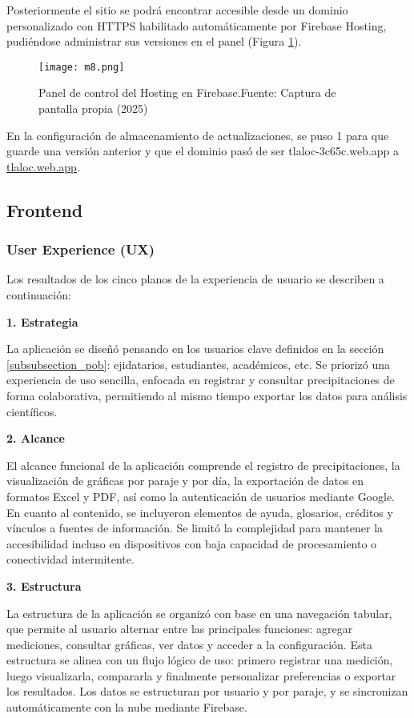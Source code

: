 Posteriormente el sitio se podrá encontrar accesible desde un dominio personalizado con HTTPS habilitado automáticamente por Firebase Hosting, pudiéndose administrar sus versiones en el panel (Figura \ref{m8}).
\begin{figure}[ht]
\centering
  \texttt{[image: m8.png]}
  \caption{Panel de control del Hosting en Firebase.Fuente: Captura de pantalla propia (2025)}
  \label{m8}
\end{figure}
En la configuración de almacenamiento de actualizaciones, se puso 1 para que guarde una versión anterior y que el dominio pasó de ser tlaloc-3c65c.web.app a \url{tlaloc.web.app}.

\newpage
\subsection{Frontend}
\subsubsection{User Experience (UX)}
Los resultados de los cinco planos de la experiencia de usuario se describen a continuación:


\textbf{1. Estrategia}

La aplicación se diseñó pensando en los usuarios clave definidos en la sección \ref{subsubsection_pob}: ejidatarios, estudiantes, académicos, etc. Se priorizó una experiencia de uso sencilla, enfocada en registrar y consultar precipitaciones de forma colaborativa, permitiendo al mismo tiempo exportar los datos para análisis científicos.

\textbf{2. Alcance}

El alcance funcional de la aplicación comprende el registro de precipitaciones, la visualización de gráficas por paraje y por día, la exportación de datos en formatos Excel y PDF, así como la autenticación de usuarios mediante Google. En cuanto al contenido, se incluyeron elementos de ayuda, glosarios, créditos y vínculos a fuentes de información. Se limitó la complejidad para mantener la accesibilidad incluso en dispositivos con baja capacidad de procesamiento o conectividad intermitente.

\textbf{3. Estructura}

La estructura de la aplicación se organizó con base en una navegación tabular, que permite al usuario alternar entre las principales funciones: agregar mediciones, consultar gráficas, ver datos y acceder a la configuración. Esta estructura se alinea con un flujo lógico de uso: primero registrar una medición, luego visualizarla, compararla y finalmente personalizar preferencias o exportar los resultados. Los datos se estructuran por usuario y por paraje, y se sincronizan automáticamente con la nube mediante Firebase.

